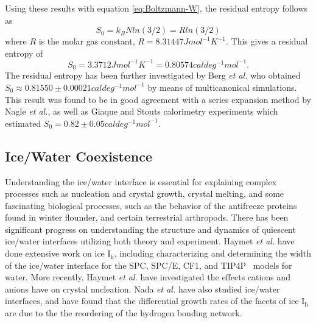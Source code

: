 Using these results with equation \ref{eq:Boltzmann-W}, the residual
entropy follows as
\begin{equation}
S_{0} = k_{B}Nln(3/2) = Rln(3/2)
\end{equation}
where $R$ is the molar gas constant, $R = 8.31447 J
mol^{-1}K^{-1}$. This gives a residual entropy of 
\begin{equation}
S_{0} = 3.3712 J mol^{-1}K^{-1} = 0.80574 cal deg^{-1} mol^{-1}.
\end{equation}
The residual entropy has been further investigated by Berg \textit{et
  al.} who obtained $S_{0} \approx 0.81550 \pm 0.00021 cal deg^{-1}
mol^{-1}$ by means of multicanonical simulations.\cite{Berg2007} This
result was found to be in good agreement with a series expansion
method by Nagle \textit{et al.}\cite{Nagle1966}, as well as Giaque and
Stouts calorimetry experiments which estimated $S_{0} = 0.82 \pm 0.05
cal deg^{-1} mol^{-1}$.\cite{Giaque1936} 

\subsection{Ice/Water Coexistence}
%


%
%

Understanding the ice/water interface is essential for explaining
complex processes such as nucleation and crystal
growth,\cite{Han1992,Granasy1995,Vanfleet1995} crystal
melting,\cite{Weber1983,Han1992,Sakai1996,Sakai1996B} and some fascinating
biological processes, such as the behavior of the antifreeze proteins
found in winter flounder,\cite{Chapsky1997 ,Wierzbicki2007} and certain
terrestrial arthropods.\cite{Duman:2001qy,Meister29012013} There has
been significant progress on understanding the structure and dynamics
of quiescent ice/water interfaces utilizing both theory and
experiment.  Haymet \emph{et al.} have done extensive work on ice I$_\mathrm{h}$,
including characterizing and determining the width of the ice/water
interface for the SPC,\cite{Karim1990} SPC/E,\cite{Gay2002,Bryk2002} CF1,\cite{Hayward2001,Hayward2002} and TIP4P~\cite{Karim1988} models for
water.
More recently, Haymet \emph{et al.} have investigated the effects
cations and anions have on crystal
nucleation.\cite{Bryk2004,Smith2005,Wilson2008,Wilson2010} Nada \emph{et al.}
have also studied ice/water
interfaces,\cite{Nada1995,Nada2000,Nada2003,Nada2012} and have found that the
differential growth rates of the facets of ice I$_\mathrm{h}$ are due to the the
reordering of the hydrogen bonding network.\cite{Nada2005}

